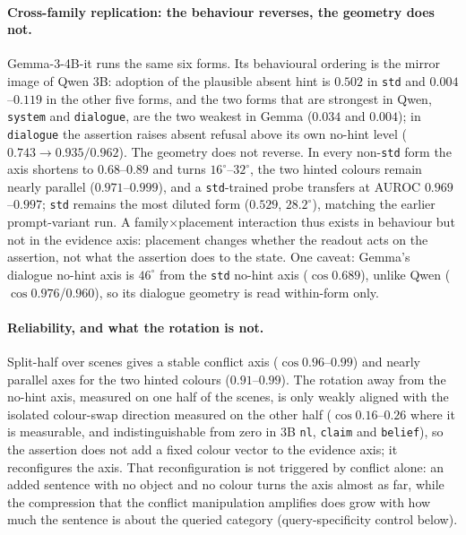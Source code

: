 \documentclass[10pt]{article}
\begin{document}
\paragraph{Cross-family replication: the behaviour reverses, the geometry does not.}
Gemma-3-4B-it runs the same six forms. Its behavioural ordering is the mirror
image of Qwen 3B: adoption of the plausible absent hint is $0.502$ in
\texttt{std} and $0.004$--$0.119$ in the other five forms, and the two forms
that are strongest in Qwen, \texttt{system} and \texttt{dialogue}, are the two
weakest in Gemma ($0.034$ and $0.004$); in \texttt{dialogue} the assertion
raises absent refusal above its own no-hint level ($0.743\to0.935/0.962$).
The geometry does not reverse. In every non-\texttt{std} form the axis
shortens to $0.68$--$0.89$ and turns $16^\circ$--$32^\circ$, the two hinted
colours remain nearly parallel ($0.971$--$0.999$), and a \texttt{std}-trained
probe transfers at AUROC $0.969$--$0.997$; \texttt{std} remains the most
diluted form ($0.529$, $28.2^\circ$), matching the earlier prompt-variant
run. A family$\times$placement interaction thus exists in behaviour but not
in the evidence axis: placement changes whether the readout acts on the
assertion, not what the assertion does to the state. One caveat: Gemma's
dialogue no-hint axis is $46^\circ$ from the \texttt{std} no-hint axis
($\cos 0.689$), unlike Qwen ($\cos 0.976$/$0.960$), so its dialogue geometry
is read within-form only.

\paragraph{Reliability, and what the rotation is not.}
Split-half over scenes gives a stable conflict axis ($\cos 0.96$--$0.99$) and
nearly parallel axes for the two hinted colours ($0.91$--$0.99$). The rotation
away from the no-hint axis, measured on one half of the scenes, is only weakly
aligned with the isolated colour-swap direction measured on the other half
($\cos 0.16$--$0.26$ where it is measurable, and indistinguishable from zero in
3B \texttt{nl}, \texttt{claim} and \texttt{belief}), so the assertion does not
add a fixed colour vector to the evidence axis; it reconfigures the axis. That
reconfiguration is not triggered by conflict alone: an added sentence with no
object and no colour turns the axis almost as far, while the compression that
the conflict manipulation amplifies does grow with how much the sentence is
about the queried category (query-specificity control below).
\end{document}
